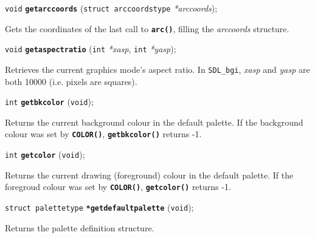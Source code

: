 \documentclass[a4paper,12pt]{article}
\newcommand{\SDLbgi}{\texttt{SDL\_bgi}}
\newcommand{\V}{\texttt{void}}      %
\newcommand{\I}{\texttt{int}}       %
\newcommand{\func}[1]{\textbf{\texttt{#1}}}  %
\newcommand{\A}[1]{\emph{#1}}       %
\newenvironment{bgi}
{ %
  \begin{snugshade}
}
{ %
  \end{snugshade}
}
\begin{document}
\label{sec:getarccoords}

\begin{bgi}
\V{} \func{getarccoords} (\texttt{struct arccoordstype} \A{*arccoords});
\end{bgi}

Gets the coordinates of the last call to \func{arc()}, filling the
\A{arccoords} structure.


\label{sec:getaspectratio}

\begin{bgi}
\V{} \func{getaspectratio} (\I{} \A{*xasp}, \I{} \A{*yasp});
\end{bgi}

Retrieves the current graphics mode's aspect ratio. In \SDLbgi,
\A{xasp} and \A{yasp} are both 10000 (i.e. pixels are squares).


\label{sec:getbkcolor}

\begin{bgi}
\I{} \func{getbkcolor} (\V{});
\end{bgi}

Returns the current background colour in the default palette. If the
background colour was set by \func{COLOR()}, \func{getbkcolor()} returns
-1.


\label{sec:getcolor}

\begin{bgi}
\I{} \func{getcolor} (\V{});
\end{bgi}

Returns the current drawing (foreground) colour in the default
palette. If the foregroud colour was set by \func{COLOR()},
\func{getcolor()} returns -1.


\label{sec:getdefaultpalette}

\begin{bgi}
\texttt{struct palettetype} \func{*getdefaultpalette} (\V{});
\end{bgi}

Returns the palette definition structure.
\end{document}
